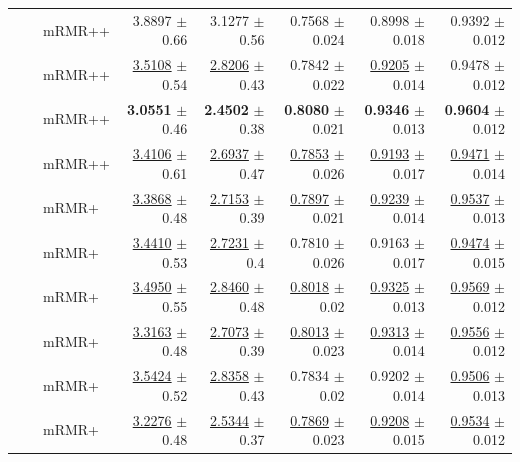 \begin{longtable}{llp{}rrrrr}
 &  & mRMR++ & 3.8897 {\scriptsize $\pm$ 0.66} & 3.1277 {\scriptsize $\pm$ 0.56} & 0.7568 {\scriptsize $\pm$ 0.024} & 0.8998 {\scriptsize $\pm$ 0.018} & 0.9392 {\scriptsize $\pm$ 0.012} \\
 &  & mRMR++ & \underline{3.5108} {\scriptsize $\pm$ 0.54} & \underline{2.8206} {\scriptsize $\pm$ 0.43} & 0.7842 {\scriptsize $\pm$ 0.022} & \underline{0.9205} {\scriptsize $\pm$ 0.014} & 0.9478 {\scriptsize $\pm$ 0.012} \\
 &  & mRMR++ & \textbf{3.0551} {\scriptsize $\pm$ 0.46} & \textbf{2.4502} {\scriptsize $\pm$ 0.38} & \textbf{0.8080} {\scriptsize $\pm$ 0.021} & \textbf{0.9346} {\scriptsize $\pm$ 0.013} & \textbf{0.9604} {\scriptsize $\pm$ 0.012} \\
 &  & mRMR++ & \underline{3.4106} {\scriptsize $\pm$ 0.61} & \underline{2.6937} {\scriptsize $\pm$ 0.47} & \underline{0.7853} {\scriptsize $\pm$ 0.026} & \underline{0.9193} {\scriptsize $\pm$ 0.017} & \underline{0.9471} {\scriptsize $\pm$ 0.014} \\
 &  & mRMR+ & \underline{3.3868} {\scriptsize $\pm$ 0.48} & \underline{2.7153} {\scriptsize $\pm$ 0.39} & \underline{0.7897} {\scriptsize $\pm$ 0.021} & \underline{0.9239} {\scriptsize $\pm$ 0.014} & \underline{0.9537} {\scriptsize $\pm$ 0.013} \\
 &  & mRMR+ & \underline{3.4410} {\scriptsize $\pm$ 0.53} & \underline{2.7231} {\scriptsize $\pm$ 0.4} & 0.7810 {\scriptsize $\pm$ 0.026} & 0.9163 {\scriptsize $\pm$ 0.017} & \underline{0.9474} {\scriptsize $\pm$ 0.015} \\
 &  & mRMR+ & \underline{3.4950} {\scriptsize $\pm$ 0.55} & \underline{2.8460} {\scriptsize $\pm$ 0.48} & \underline{0.8018} {\scriptsize $\pm$ 0.02} & \underline{0.9325} {\scriptsize $\pm$ 0.013} & \underline{0.9569} {\scriptsize $\pm$ 0.012} \\
 &  & mRMR+ & \underline{3.3163} {\scriptsize $\pm$ 0.48} & \underline{2.7073} {\scriptsize $\pm$ 0.39} & \underline{0.8013} {\scriptsize $\pm$ 0.023} & \underline{0.9313} {\scriptsize $\pm$ 0.014} & \underline{0.9556} {\scriptsize $\pm$ 0.012} \\
 &  & mRMR+ & \underline{3.5424} {\scriptsize $\pm$ 0.52} & \underline{2.8358} {\scriptsize $\pm$ 0.43} & 0.7834 {\scriptsize $\pm$ 0.02} & 0.9202 {\scriptsize $\pm$ 0.014} & \underline{0.9506} {\scriptsize $\pm$ 0.013} \\
 &  & mRMR+ & \underline{3.2276} {\scriptsize $\pm$ 0.48} & \underline{2.5344} {\scriptsize $\pm$ 0.37} & \underline{0.7869} {\scriptsize $\pm$ 0.023} & \underline{0.9208} {\scriptsize $\pm$ 0.015} & \underline{0.9534} {\scriptsize $\pm$ 0.012} \\

\end{longtable}
